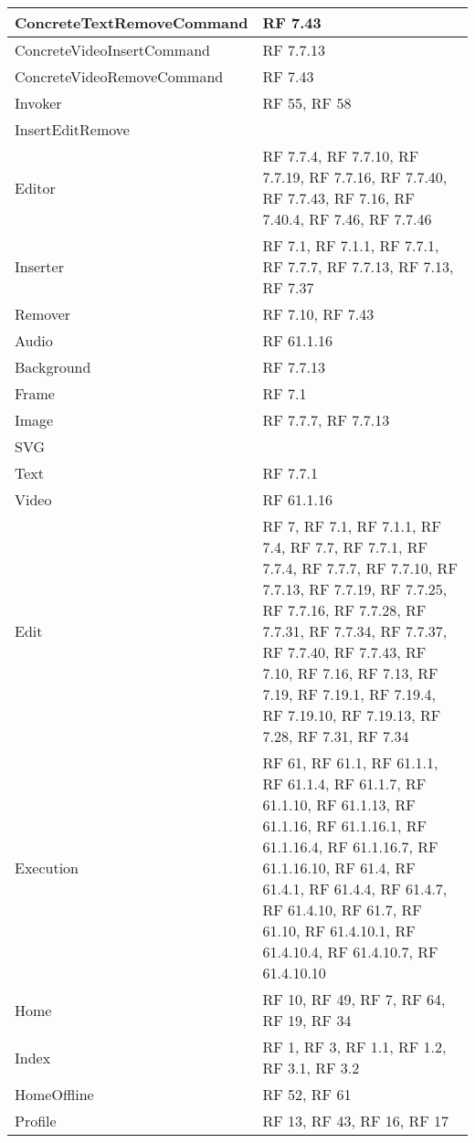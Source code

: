 {\begin{center}
\begin{longtable} [c]{| p{7cm} | p{6cm} |}
 \hline 
ConcreteTextRemoveCommand & RF 7.43\\ 
 \hline 
ConcreteVideoInsertCommand & RF 7.7.13\\ 
 \hline 
ConcreteVideoRemoveCommand & RF 7.43\\ 
 \hline 
Invoker & RF 55, RF 58\\ 
 \hline 
InsertEditRemove & \\ 
 \hline 
Editor & RF 7.7.4, RF 7.7.10, RF 7.7.19, RF 7.7.16, RF 7.7.40, RF 7.7.43, RF 7.16, RF 7.40.4, RF 7.46, RF 7.7.46\\ 
 \hline 
Inserter & RF 7.1, RF 7.1.1, RF 7.7.1, RF 7.7.7, RF 7.7.13, RF 7.13, RF 7.37\\ 
 \hline 
Remover & RF 7.10, RF 7.43\\ 
 \hline 
Audio & RF 61.1.16\\ 
 \hline 
Background & RF 7.7.13\\ 
 \hline 
Frame & RF 7.1\\ 
 \hline 
Image & RF 7.7.7, RF 7.7.13\\ 
 \hline 
SVG & \\ 
 \hline 
Text & RF 7.7.1\\ 
 \hline 
Video & RF 61.1.16\\
 \hline 
Edit & RF 7, RF 7.1, RF 7.1.1, RF 7.4, RF 7.7, RF 7.7.1, RF 7.7.4, RF 7.7.7, RF 7.7.10, RF 7.7.13, RF 7.7.19, RF 7.7.25, RF 7.7.16, RF 7.7.28, RF 7.7.31, RF 7.7.34, RF 7.7.37, RF 7.7.40, RF 7.7.43, RF 7.10, RF 7.16, RF 7.13, RF 7.19, RF 7.19.1, RF 7.19.4, RF 7.19.10, RF 7.19.13, RF 7.28, RF 7.31, RF 7.34\\ 
 \hline 
Execution & RF 61, RF 61.1, RF 61.1.1, RF 61.1.4, RF 61.1.7, RF 61.1.10, RF 61.1.13, RF 61.1.16, RF 61.1.16.1, RF 61.1.16.4, RF 61.1.16.7, RF 61.1.16.10, RF 61.4, RF 61.4.1, RF 61.4.4, RF 61.4.7, RF 61.4.10, RF 61.7, RF 61.10, RF 61.4.10.1, RF 61.4.10.4, RF 61.4.10.7, RF 61.4.10.10\\ 
 \hline 
Home & RF 10, RF 49, RF 7, RF 64, RF 19, RF 34\\ 
 \hline 
Index & RF 1, RF 3, RF 1.1, RF 1.2, RF 3.1, RF 3.2\\ 
 \hline 
HomeOffline & RF 52, RF 61\\ 
 \hline 
Profile & RF 13, RF 43, RF 16, RF 17\\ 
 \hline 
\end{longtable}

\end{center}
}